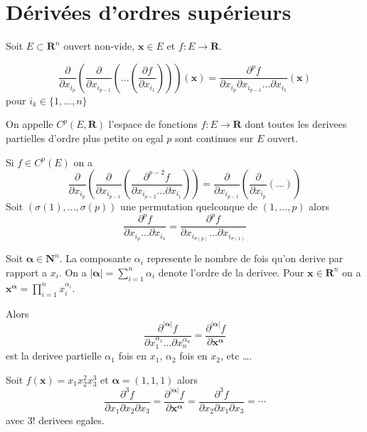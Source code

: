 
\section{Dérivées d'ordres supérieurs}

Soit $E\subset \mathbf{R}^{n}$ ouvert non-vide, $\boldsymbol{x}\in E$ et $f:E\to \mathbf{R}$. 
\begin{notation}
$$
\frac{ \partial  }{ \partial x_{i_{p}} } \left( \frac{ \partial  }{ \partial x_{i_{p-1}} } \left( \dots\left( \frac{ \partial f }{ \partial x_{i_{1}} }  \right) \right) \right)(\boldsymbol{x})= \frac{ \partial^{p}f }{ \partial x_{i_{p}}\partial x_{i_{p-1}}\dots \partial x_{i_{1}} }(\boldsymbol{x}) 
$$
pour $i_{k}\in \{ 1,\dots ,n \}$
\end{notation}

\begin{definition}
On appelle $C^{p}(E,\mathbf{R})$ l'espace de fonctions $f:E\to \mathbf{R}$ dont toutes les derivees partielles d'ordre plus petite ou egal $p$ sont continues sur $E$ ouvert.
\end{definition}

Si $f\in C^{p}(E)$ on a 
$$
\frac{ \partial  }{ \partial x_{i_{p}} } \left( \frac{ \partial  }{ \partial x_{i_{p-1}} } \left( \frac{ \partial^{p-2}f }{ \partial x_{i_{p-2}}\dots \partial x_{i_{1}} }  \right) \right)=\frac{ \partial  }{ \partial x_{i_{p-1}} } \left( \frac{ \partial  }{ \partial x_{i_{p}} } (\dots) \right)
$$
Soit $(\sigma(1),\dots,\sigma(p))$ une permutation quelconque de $(1,\dots,p)$ alors
$$
\frac{ \partial^{p}f }{ \partial x_{i_{p}}\dots \partial x_{i_{1}} } =\frac{ \partial^{p}f }{ \partial x_{i_{\sigma(p)}}\dots \partial x_{i_{\sigma(1)}} } 
$$

\begin{notation}
Soit $\boldsymbol{\alpha}\in \mathbf{N}^{n}$. La composante $\alpha _{i}$ represente le nombre de fois qu'on derive par rapport a $x_{i}$. On a $|\boldsymbol{\alpha}|=\sum_{i=1}^{n}\alpha _{i}$ denote l'ordre de la derivee. Pour $\boldsymbol{x}\in \mathbf{R}^{n}$ on a $\boldsymbol{x}^{\boldsymbol{\alpha}}=\prod_{i=1}^{n}x_{i}^{\alpha _{i}}$. 

Alors
$$
\frac{ \partial^{|\boldsymbol{\alpha}|}f }{ \partial x_{1}^{\alpha_{1}}\dots \partial x_{n}^{\alpha _{n}} }=\frac{ \partial^{|\boldsymbol{\alpha}|}f }{ \partial \boldsymbol{x}^{\boldsymbol{\alpha}} } 
$$
est la derivee partielle $\alpha_{1}$ fois en $x_{1}$, $\alpha _{2}$ fois en $x_{2}$, etc \dots.
\end{notation}
\begin{example}
Soit $f(\boldsymbol{x})=x_{1}x_{2}^{2}x_{3}^{3}$ et $\boldsymbol{\alpha}=(1,1,1)$ alors 
$$
\frac{ \partial^{3} f}{ \partial x_{1}\partial x_{2}\partial x_{3} }=\frac{ \partial^{|\boldsymbol{\alpha}|}f }{ \partial \boldsymbol{x}^{\boldsymbol{\alpha}} }=\frac{ \partial^{3} f}{ \partial x_{2}\partial x_{1}\partial x_{3} }=\cdots
$$
avec $3!$ derivees egales. 
\end{example}

